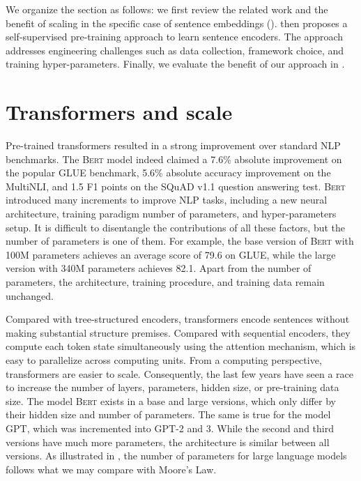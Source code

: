 We organize the section as follows: we first review the related work and the benefit of scaling in the specific case of sentence embeddings ().  then proposes a self-supervised pre-training approach to learn sentence encoders. The approach addresses engineering challenges such as data collection, framework choice, and training hyper-parameters. Finally, we evaluate the benefit of our approach in .

\section{Transformers and scale}

Pre-trained transformers resulted in a strong improvement over standard NLP benchmarks. The \textsc{Bert} model indeed claimed a 7.6\% absolute improvement on the popular GLUE benchmark, 5.6\% absolute accuracy improvement on the MultiNLI, and 1.5 F1 points on the SQuAD v1.1 question answering test. \textsc{Bert} introduced many increments to improve NLP tasks, including a new neural architecture, training paradigm number of parameters, and hyper-parameters setup. It is difficult to disentangle the contributions of all these factors, but the number of parameters is one of them. For example, the base version of \textsc{Bert} with 100M parameters achieves an average score of 79.6 on GLUE, while the large version with 340M parameters achieves 82.1. Apart from the number of parameters, the architecture, training procedure, and training data remain unchanged.

Compared with tree-structured encoders, transformers encode sentences without making substantial structure premises. Compared with sequential encoders, they compute each token state simultaneously using the attention mechanism, which is easy to parallelize across computing units. From a computing perspective, transformers are easier to scale. Consequently, the last few years have seen a race to increase the number of layers, parameters, hidden size, or pre-training data size. The model \textsc{Bert} exists in a base and large versions, which only differ by their hidden size and number of parameters. The same is true for the model GPT, which was incremented into GPT-2 and 3. While the second and third versions have much more parameters, the architecture is similar between all versions. As illustrated in , the number of parameters for large language models follows what we may compare with Moore's Law.

